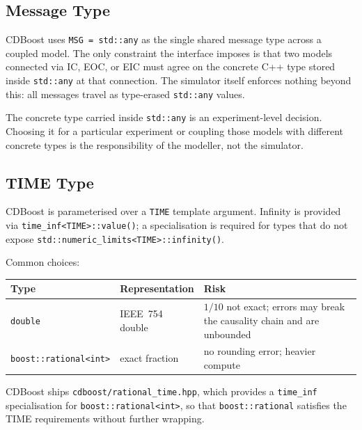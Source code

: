 \subsection*{Message Type}

CDBoost uses \texttt{MSG = std::any} as the single shared message type
across a coupled model.  The only constraint the interface imposes is
that two models connected via IC, EOC, or EIC must agree on the
concrete C++ type stored inside \texttt{std::any} at that connection.
The simulator itself enforces nothing beyond this: all messages travel
as type-erased \texttt{std::any} values.

The concrete type carried inside \texttt{std::any} is an
experiment-level decision.  Choosing it for a particular experiment or
coupling those models with different concrete types is the
responsibility of the modeller, not the simulator.

\subsection*{TIME Type}

CDBoost is parameterised over a \texttt{TIME} template argument.
Infinity is provided via \texttt{time\_inf<TIME>::value()}; a
specialisation is required for types that do not expose
\texttt{std::numeric\_limits<TIME>::infinity()}.

Common choices:

{\small
\begin{center}
\begin{tabular}{@{}llp{5cm}@{}}
  \toprule
  Type & Representation & Risk \\
  \midrule
  \texttt{double} & IEEE~754 double &
    $1/10$ not exact; errors may break the causality
    chain and are unbounded \\[4pt]
  \texttt{boost::rational<int>} & exact fraction &
    no rounding error; heavier compute \\
  \bottomrule
\end{tabular}
\end{center}}

CDBoost ships \texttt{cdboost/rational\_time.hpp}, which provides a
\texttt{time\_inf} specialisation for \texttt{boost::rational<int>},
so that \texttt{boost::rational} satisfies the TIME requirements
without further wrapping.

